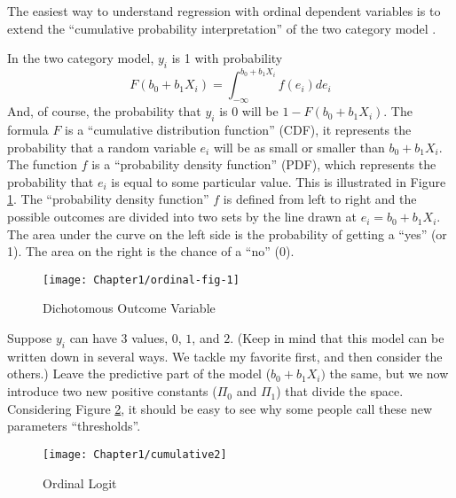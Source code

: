 The easiest way to understand regression with ordinal dependent variables
is to extend the ``cumulative probability interpretation'' of the
two category model \citep{pinheiro_mixed-effects_2000}. 

In the two category model, $y_{i}$ is 1 with probability 
\begin{equation}
F(b_{0}+b_{1}X_{i})=\int_{-\infty}^{b_{0}+b_{1}X_{i}}f(e_{i})de_{i}
\end{equation}
And, of course, the probability that $y_{i}$ is 0 will be $1-F(b_{0}+b_{1}X_{i}).$
The formula $F$ is a ``cumulative distribution function'' (CDF),
it represents the probability that a random variable $e_{i}$ will
be as small or smaller than $b_{0}+b_{1}X_{i}$. The function $f$
is a ``probability density function'' (PDF), which represents the
probability that $e_{i}$ is equal to some particular value. This
is illustrated in Figure \ref{fig:Dichotomous}. The ``probability
density function'' $f$ is defined from left to right and the possible
outcomes are divided into two sets by the line drawn at $e_{i}=b_{0}+b_{1}X_{i}$.
The area under the curve on the left side is the probability of getting
a ``yes'' (or 1). The area on the right is the chance of a ``no''
(0).

\begin{figure}
\begin{centering}
\texttt{[image: Chapter1/ordinal-fig-1]}
\par\end{centering}
\caption{Dichotomous Outcome Variable\label{fig:Dichotomous}}
\end{figure}

Suppose $y_{i}$ can have $3$ values, $0$, $1$, and $2$. (Keep
in mind that this model can be written down in several ways. We tackle
my favorite first, and then consider the others.) Leave the predictive
part of the model ($b_{0}+b_{1}X_{i})$ the same, but we now introduce
two new positive constants ($\Pi_{0}$ and $\Pi_{1}$) that divide
the space. Considering Figure \ref{cap:Ordinal-Logit}, it should
be easy to see why some people call these new parameters ``thresholds''. 

\begin{figure}
\begin{centering}
\texttt{[image: Chapter1/cumulative2]}
\par\end{centering}
\caption{Ordinal Logit\label{cap:Ordinal-Logit}}
\end{figure}

